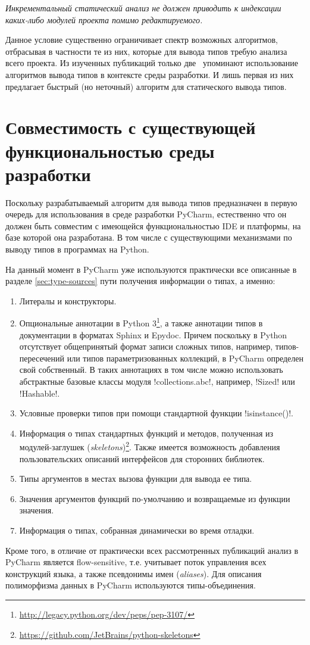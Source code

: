 \emph{Инкрементальный статический анализ не должен приводить к индексации 
 каких-либо модулей проекта помимо редактируемого.}

Данное условие существенно ограничивает спектр возможных алгоритмов, отбрасывая
в частности те из них, которые для вывода типов требую анализа всего проекта. Из
 изученных публикаций только две~\cite{Pluquet2009,Haupt2011} упоминают
использование алгоритмов вывода типов в контексте среды разработки. И лишь
первая из них предлагает быстрый (но неточный) алгоритм для статического вывода типов.

\section{Совместимость с существующей функциональностью среды разработки}
\label{sec:compatibility-requirement}

Поскольку разрабатываемый алгоритм для вывода типов предназначен в первую
очередь для использования в среде разработки PyCharm, естественно что он должен
быть совместим с имеющейся функциональностью IDE и платформы, на базе которой
она разработана. В том числе с существующими механизмами по выводу типов в
программах на Python. 

На данный момент в PyCharm уже используются практически все описанные в разделе
\ref{sec:type-sources} пути получения информации о типах, а именно:

\begin{enumerate}
    \item Литералы и конструкторы.

    \item Опциональные аннотации в Python
      3\footnote{\url{http://legacy.python.org/dev/peps/pep-3107/}}, а также
      аннотации типов в документации в форматах Sphinx и Epydoc. Причем поскольку в
      Python отсутствует общепринятый формат записи сложных типов, например,
      типов-пересечений или типов параметризованных коллекций, в PyCharm
      определен свой собственный.
      В таких аннотациях в том числе можно использовать абстрактные базовые
      классы модуля !collections.abc!, например, !Sized! или !Hashable!.

    \item Условные проверки типов при помощи стандартной функции !isinstance()!.

    \item Информация о типах стандартных функций и методов, полученная из
        модулей-заглушек
        (\emph{skeletons})\footnote{\url{https://github.com/JetBrains/python-skeletons}}.
        Также имеется возможность добавления пользовательских описаний
        интерфейсов для сторонних библиотек.

    \item Типы аргументов в местах вызова функции для вывода ее типа.

    \item Значения аргументов функций по-умолчанию и возвращаемые из функции
        значения.

    \item Информация о типах, собранная динамически во время отладки.
\end{enumerate}

Кроме того, в отличие от практически всех рассмотренных публикаций анализ в
PyCharm является flow-sensitive, т.е. учитывает поток управления всех
конструкций языка, а также псевдонимы имен (\emph{aliases}). Для описания полиморфизма
данных в PyCharm используются типы-объединения. 


